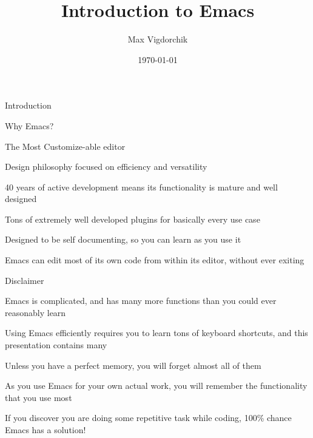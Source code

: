 \documentclass[presentation]{beamer}
\author{Max Vigdorchik}
\date{\today}
\title{Introduction to Emacs}
\begin{document}
\maketitle

\begin{frame}[label=sec-1]{Introduction}
\begin{block}{Why Emacs?}
\begin{block}{The Most Customize-able editor}
\end{block}
\begin{block}{Design philosophy focused on efficiency and versatility}
\end{block}
\begin{block}{40 years of active development means its functionality is mature and well designed}
\end{block}
\begin{block}{Tons of extremely well developed plugins for basically every use case}
\end{block}
\begin{block}{Designed to be self documenting, so you can learn as you use it}
\end{block}
\begin{block}{Emacs can edit most of its own code from within its editor, without ever exiting}
\end{block}
\end{block}
\begin{block}{Disclaimer}
\begin{block}{Emacs is complicated, and has many more functions than you could ever reasonably learn}
\end{block}
\begin{block}{Using Emacs efficiently requires you to learn tons of keyboard shortcuts, and this presentation contains many}
\begin{block}{Unless you have a perfect memory, you will forget almost all of them}
\end{block}
\begin{block}{As you use Emacs for your own actual work, you will remember the functionality that you use most}
\end{block}
\begin{block}{If you discover you are doing some repetitive task while coding, 100\% chance Emacs has a solution!}
\end{block}
\end{block}
\end{block}
\end{frame}
\end{document}
